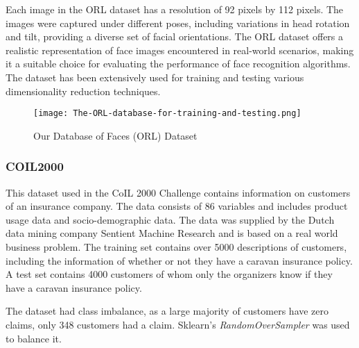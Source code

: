 Each image in the ORL dataset has a resolution of 92 pixels by 112 pixels. The images were captured under different poses, including variations in head rotation and tilt, providing a diverse set of facial orientations. The ORL dataset offers a realistic representation of face images encountered in real-world scenarios, making it a suitable choice for evaluating the performance of face recognition algorithms. The dataset has been extensively used for training and testing various dimensionality reduction techniques.

\begin{figure}
    \centering
    \texttt{[image: The-ORL-database-for-training-and-testing.png]}
    \caption{Our Database of Faces (ORL) Dataset}
    \label{fig:orl_faces}
\end{figure}

\subsubsection{COIL2000}\label{section:coil-dataset}
This dataset used in the CoIL 2000 Challenge contains information on customers of an insurance company.\cite{coil} The data consists of 86 variables and includes product usage data and socio-demographic data. The data was supplied by the Dutch data mining company Sentient Machine Research and is based on a real world business problem. The training set contains over 5000 descriptions of customers, including the information of whether or not they have a caravan insurance policy. A test set contains 4000 customers of whom only the organizers know if they have a caravan insurance policy.

The dataset had class imbalance, as a large majority of customers have zero claims, only 348 customers had a claim. Sklearn's \textit{RandomOverSampler} was used to balance it.
